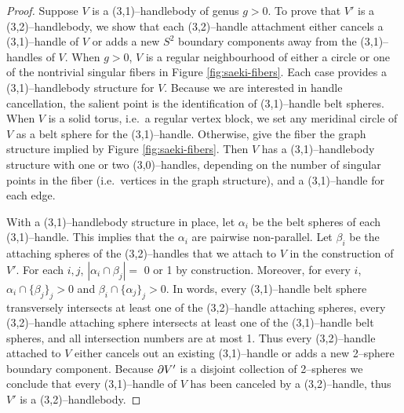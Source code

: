 \begin{proof}
	Suppose $V$ is a (3,1)--handlebody of genus $g>0$.
	To prove that $V'$ is a (3,2)--handlebody, we show that each (3,2)--handle attachment either cancels a (3,1)--handle of $V$ or adds a new $S^2$ boundary components away from the (3,1)--handles of $V$.
	When $g>0$, $V$ is a regular neighbourhood of either a circle or one of the nontrivial singular fibers in Figure \ref{fig:saeki-fibers}.
	Each case provides a (3,1)--handlebody structure for $V$.
	Because we are interested in handle cancellation, the salient point is the identification of (3,1)--handle belt spheres.
	When $V$ is a solid torus, i.e.\ a regular vertex block, we set any meridinal circle of $V$ as a belt sphere for the (3,1)--handle.
	Otherwise, give the fiber the graph structure implied by Figure \ref{fig:saeki-fibers}.
	Then $V$ has a (3,1)--handlebody structure with one or two (3,0)--handles, depending on the number of singular points in the fiber (i.e.\ vertices in the graph structure), and a (3,1)--handle for each edge.
	
	With a (3,1)--handlebody structure in place, let $\alpha_i$ be the belt spheres of each (3,1)--handle.
	This implies that the $\alpha_i$ are pairwise non-parallel.
	Let $\beta_i$ be the attaching spheres of the (3,2)--handles that we attach to $V$ in the construction of $V'$.
	For each $i,j$, $|\alpha_i\cap\beta_j|=$ 0 or 1 by construction.
	Moreover, for every $i$, $\alpha_i\cap\{\beta_j\}_j>0$ and $\beta_i\cap\{\alpha_j\}_j>0$.
	In words, every (3,1)--handle belt sphere transversely intersects at least one of the (3,2)--handle attaching spheres, every (3,2)--handle attaching sphere intersects at least one of the (3,1)--handle belt spheres, and all intersection numbers are at most 1.
	Thus every (3,2)--handle attached to $V$ either cancels out an existing (3,1)--handle or adds a new 2--sphere boundary component.
	Because $\partial V'$ is a disjoint collection of 2--spheres we conclude that every (3,1)--handle of $V$ has been canceled by a (3,2)--handle, thus $V'$ is a (3,2)--handlebody.

%	
	

\end{proof}
